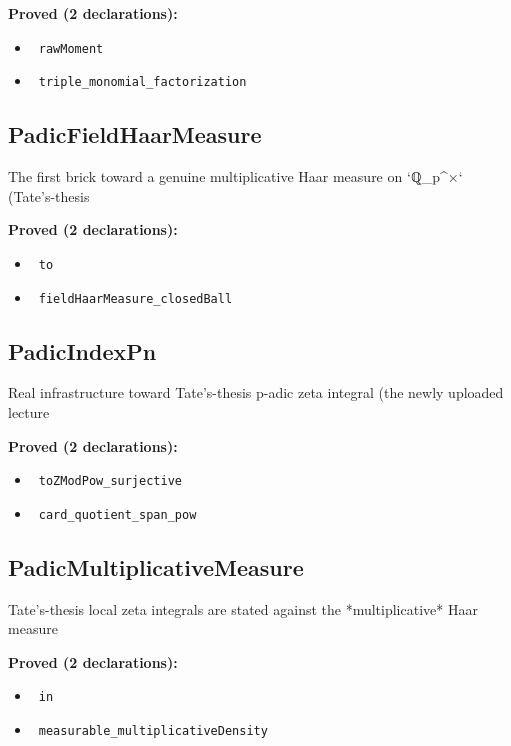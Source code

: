 \documentclass{report}
\theoremstyle{definition}
\begin{document}
\noindent\textbf{Proved (2 declarations):}
\begin{itemize}
  \item {}\leanok\ \texttt{rawMoment}
  \item {}\leanok\ \texttt{triple\_monomial\_factorization}
\end{itemize}

\subsection{PadicFieldHaarMeasure}
The first brick toward a genuine multiplicative Haar measure on `ℚ\_p^×` (Tate's-thesis

\noindent\textbf{Proved (2 declarations):}
\begin{itemize}
  \item {}\leanok\ \texttt{to}
  \item {}\leanok\ \texttt{fieldHaarMeasure\_closedBall}
\end{itemize}

\subsection{PadicIndexPn}
Real infrastructure toward Tate's-thesis p-adic zeta integral (the newly uploaded lecture

\noindent\textbf{Proved (2 declarations):}
\begin{itemize}
  \item {}\leanok\ \texttt{toZModPow\_surjective}
  \item {}\leanok\ \texttt{card\_quotient\_span\_pow}
\end{itemize}

\subsection{PadicMultiplicativeMeasure}
Tate's-thesis local zeta integrals are stated against the *multiplicative* Haar measure

\noindent\textbf{Proved (2 declarations):}
\begin{itemize}
  \item {}\leanok\ \texttt{in}
  \item {}\leanok\ \texttt{measurable\_multiplicativeDensity}
\end{itemize}
\end{document}
